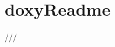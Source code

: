 \chapter{doxy\+Readme}
\hypertarget{md__c_1_2_users_2regely_2source_2repos_2_baos_mini_2_baos_mini_2doxy_readme}{}\label{md__c_1_2_users_2regely_2source_2repos_2_baos_mini_2_baos_mini_2doxy_readme}
/// 